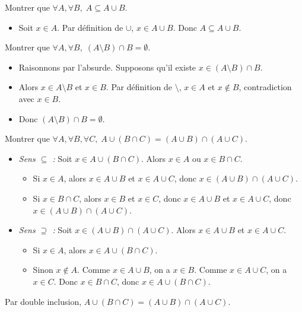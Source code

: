 \begin{corrections}

  \begin{questions}

  \item Montrer que $\forall A, \forall B, \; A \subseteq A \cup B$.
    \begin{itemize}
    \item Soit $x \in A$. Par définition de $\cup$, $x \in A \cup B$. Donc $A \subseteq A \cup B$.
    \end{itemize}

  \item Montrer que $\forall A, \forall B, \; (A \setminus B) \cap B = \emptyset$.
    \begin{itemize}
    \item Raisonnons par l’absurde. Supposons qu’il existe $x \in (A \setminus B) \cap B$.
    \item Alors $x \in A \setminus B$ et $x \in B$. Par définition de $\setminus$, $x \in A$ et $x \notin B$, contradiction avec $x \in B$.
    \item Donc $(A \setminus B) \cap B = \emptyset$.
    \end{itemize}

  \item Montrer que $\forall A, \forall B, \forall C, \; A \cup (B \cap C) = (A \cup B) \cap (A \cup C)$.
    \begin{itemize}
    \item \textit{Sens $\subseteq$ :} Soit $x \in A \cup (B \cap C)$. Alors $x \in A$ ou $x \in B \cap C$.
      \begin{itemize}
      \item Si $x \in A$, alors $x \in A \cup B$ et $x \in A \cup C$, donc $x \in (A \cup B) \cap (A \cup C)$.
      \item Si $x \in B \cap C$, alors $x \in B$ et $x \in C$, donc $x \in A \cup B$ et $x \in A \cup C$, donc $x \in (A \cup B) \cap (A \cup C)$.
      \end{itemize}
    \item \textit{Sens $\supseteq$ :} Soit $x \in (A \cup B) \cap (A \cup C)$. Alors $x \in A \cup B$ et $x \in A \cup C$.
      \begin{itemize}
      \item Si $x \in A$, alors $x \in A \cup (B \cap C)$.
      \item Sinon $x \notin A$. Comme $x \in A \cup B$, on a $x \in B$. Comme $x \in A \cup C$, on a $x \in C$. Donc $x \in B \cap C$, donc $x \in A \cup (B \cap C)$.
      \end{itemize}
    \end{itemize}
    Par double inclusion, $A \cup (B \cap C) = (A \cup B) \cap (A \cup C)$.


\end{questions}
\end{corrections}
